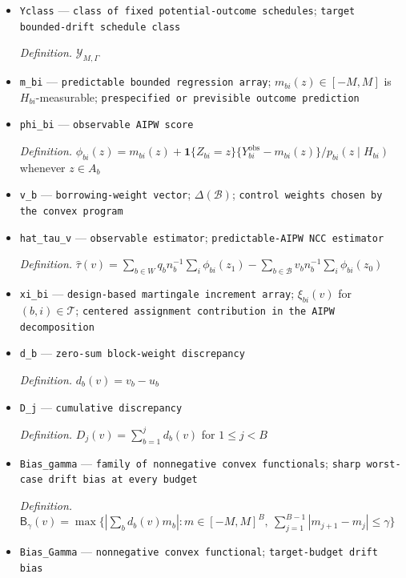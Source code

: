 \documentclass{article}
\begin{document}
\begin{itemize}
  \item \texttt{Yclass} --- \texttt{class of fixed potential-\allowbreak{}outcome schedules}; \texttt{target bounded-\allowbreak{}drift schedule class}
  \par\smallskip\noindent\emph{Definition.} \(\mathcal Y_{M,\Gamma}\)
  \item \texttt{m\_\allowbreak{}bi} --- \texttt{predictable bounded regression array}; \(m_{bi}(z)\in[-M,M]\) is \(H_{bi}\)-measurable; \texttt{prespecified or previsible outcome prediction}
  \item \texttt{phi\_\allowbreak{}bi} --- \texttt{observable AIPW score}
  \par\smallskip\noindent\emph{Definition.} \(\phi_{bi}(z)=m_{bi}(z)+\mathbf 1\{Z_{bi}=z\}\{Y^{\mathrm{obs}}_{bi}-m_{bi}(z)\}/p_{bi}(z\mid H_{bi})\) whenever \(z\in A_b\)
  \item \texttt{v\_\allowbreak{}b} --- \texttt{borrowing-\allowbreak{}weight vector}; \(\Delta(\mathcal B)\); \texttt{control weights chosen by the convex program}
  \item \texttt{hat\_\allowbreak{}tau\_\allowbreak{}v} --- \texttt{observable estimator}; \texttt{predictable-\allowbreak{}AIPW NCC estimator}
  \par\smallskip\noindent\emph{Definition.} \(\widehat\tau(v)=\sum_{b\in W}q_b n_b^{-1}\sum_i\phi_{bi}(z_1)-\sum_{b\in\mathcal B}v_b n_b^{-1}\sum_i\phi_{bi}(z_0)\)
  \item \texttt{xi\_\allowbreak{}bi} --- \texttt{design-\allowbreak{}based martingale increment array}; \(\xi_{bi}(v)\) for \((b,i)\in\mathcal T\); \texttt{centered assignment contribution in the AIPW decomposition}
  \item \texttt{d\_\allowbreak{}b} --- \texttt{zero-\allowbreak{}sum block-\allowbreak{}weight discrepancy}
  \par\smallskip\noindent\emph{Definition.} \(d_b(v)=v_b-u_b\)
  \item \texttt{D\_\allowbreak{}j} --- \texttt{cumulative discrepancy}
  \par\smallskip\noindent\emph{Definition.} \(D_j(v)=\sum_{b=1}^{j}d_b(v)\) for \(1\le j<B\)
  \item \texttt{Bias\_\allowbreak{}gamma} --- \texttt{family of nonnegative convex functionals}; \texttt{sharp worst-\allowbreak{}case drift bias at every budget}
  \par\smallskip\noindent\emph{Definition.} \(\mathsf B_\gamma(v)=\max\{|\sum_b d_b(v)m_b|:m\in[-M,M]^B,\ \sum_{j=1}^{B-1}|m_{j+1}-m_j|\le\gamma\}\)
  \item \texttt{Bias\_\allowbreak{}Gamma} --- \texttt{nonnegative convex functional}; \texttt{target-\allowbreak{}budget drift bias}

\end{itemize}
\end{document}
